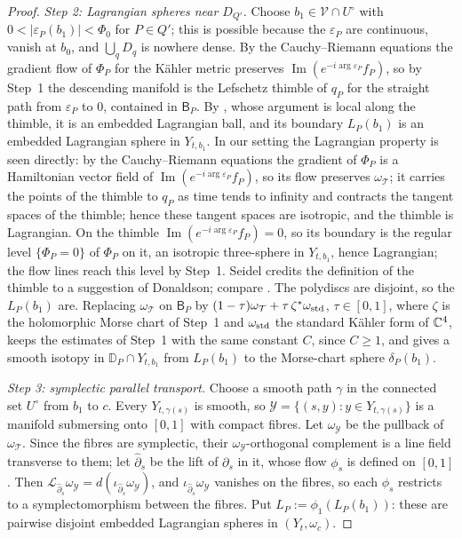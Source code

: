 \begin{proof}
\emph{Step 2: Lagrangian spheres near $D_{Q'}$.} Choose $b_1\in\mathcal V\cap U^\circ$ with $0<|\varepsilon_P(b_1)|<\Phi_0$
for $P\in Q'$; this is possible because the $\varepsilon_P$ are continuous, vanish at $b_0$, and $\bigcup_qD_q$ is nowhere
dense. By the Cauchy--Riemann equations the gradient flow of $\Phi_P$ for the K\"ahler metric preserves
$\operatorname{Im}(e^{-i\arg\varepsilon_P}f_P)$, so by Step~1 the descending manifold is the Lefschetz thimble of $q_P$ for
the straight path from $\varepsilon_P$ to $0$, contained in $\mathsf B_P$. By \cite[\S1.3, Lemmas~1.13--1.14]{Seidel},
whose argument is local along the thimble, it is an embedded Lagrangian ball, and its boundary $L_P(b_1)$ is an embedded
Lagrangian sphere in $Y_{t,b_1}$. In our setting the Lagrangian property is seen directly: by the Cauchy--Riemann
equations the gradient of $\Phi_P$ is a Hamiltonian vector field of $\operatorname{Im}(e^{-i\arg\varepsilon_P}f_P)$, so its
flow preserves $\omega_{\mathcal T}$; it carries the points of the thimble to $q_P$ as time tends to infinity and contracts
the tangent spaces of the thimble; hence these tangent spaces are isotropic, and the thimble is Lagrangian. On the thimble
$\operatorname{Im}(e^{-i\arg\varepsilon_P}f_P)=0$, so its boundary is the regular level $\{\Phi_P=0\}$ of $\Phi_P$ on it, an
isotropic three-sphere in $Y_{t,b_1}$, hence Lagrangian; the flow lines reach this level by Step~1. Seidel credits the
definition of the thimble to a suggestion of Donaldson; compare \cite{Donaldson}. The
polydiscs are disjoint, so the $L_P(b_1)$ are. Replacing $\omega_{\mathcal T}$ on $\mathsf B_P$ by
$(1-\tau)\omega_{\mathcal T}+\tau\,\zeta^*\omega_{\rm std}$, $\tau\in[0,1]$, where $\zeta$ is the holomorphic Morse chart of
Step~1 and $\omega_{\rm std}$ the standard K\"ahler form of $\mathbb C^4$, keeps the estimates of Step~1 with the same constant $C$, since $C\ge1$, and gives a smooth isotopy in
$\mathbb D_P\cap Y_{t,b_1}$ from $L_P(b_1)$ to the Morse-chart sphere $\delta_P(b_1)$.

\emph{Step 3: symplectic parallel transport.} Choose a smooth path $\gamma$ in the connected set $U^\circ$ from $b_1$ to
$c$. Every $Y_{t,\gamma(s)}$ is smooth, so $\mathcal Y=\{(s,y):y\in Y_{t,\gamma(s)}\}$ is a manifold submersing onto
$[0,1]$ with compact fibres. Let $\omega_{\mathcal Y}$ be the pullback of $\omega_{\mathcal T}$. Since the fibres are
symplectic, their $\omega_{\mathcal Y}$-orthogonal complement is a line field transverse to them; let $\hat\partial_s$ be
the lift of $\partial_s$ in it, whose flow $\phi_s$ is defined on $[0,1]$. Then
$\mathcal L_{\hat\partial_s}\omega_{\mathcal Y}=d(\iota_{\hat\partial_s}\omega_{\mathcal Y})$, and
$\iota_{\hat\partial_s}\omega_{\mathcal Y}$ vanishes on the fibres, so each $\phi_s$ restricts to a symplectomorphism between
the fibres. Put $L_P:=\phi_1(L_P(b_1))$: these are pairwise disjoint embedded Lagrangian spheres in $(Y_t,\omega_c)$.


\end{proof}
